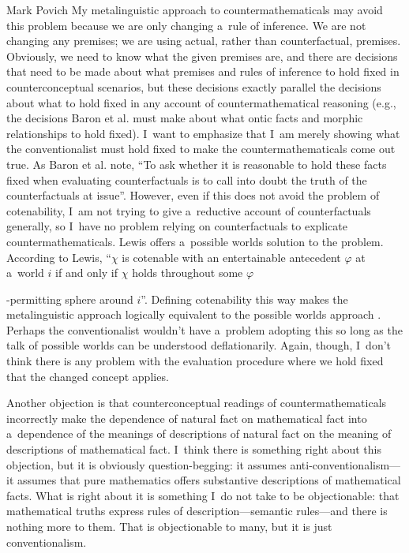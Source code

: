 \begin{artengenv}{Mark Povich}
My metalinguistic approach to countermathematicals may avoid this problem because we are only changing a~rule of inference. We are not changing any premises; we are using actual, rather than counterfactual, premises. Obviously, we need to know what the given premises are, and there are decisions that need to be made about what premises and rules of inference to hold fixed in counterconceptual scenarios, but these decisions exactly parallel the decisions about what to hold fixed in any account of countermathematical reasoning (e.g., the decisions Baron et al. must make about what ontic facts and morphic relationships to hold fixed). I~want to emphasize that I~am merely showing what the conventionalist must hold fixed to make the countermathematicals come out true. As Baron et al.
\parencite*[][p.12]{balaguer_mathematical_2017} %
 note, ``To ask whether it is reasonable to hold these facts fixed when evaluating counterfactuals is to call into doubt the truth of the counterfactuals at issue''. However, even if this does not avoid the problem of cotenability, I~am not trying to give a~reductive account of counterfactuals generally, so I~have no problem relying on counterfactuals to explicate countermathematicals. Lewis 
\parencite*[][p.69]{lewis_counterfactuals_1973} %
 offers a~possible worlds solution to the problem. According to Lewis, ``$\chi $ is cotenable with an entertainable antecedent $\varphi $ at a~world $i$ if and only if $\chi $ holds throughout some $\varphi${-permitting sphere around $i$''. Defining cotenability this way makes the metalinguistic approach logically equivalent to the possible worlds approach 
\parencite[][p.69]{lewis_counterfactuals_1973}. %
 Perhaps the conventionalist wouldn't have a~problem adopting this so long as the talk of possible worlds can be understood deflationarily. Again, though, I~don't think there is any problem with the evaluation procedure where we hold fixed that the changed concept applies.

Another objection is that counterconceptual readings of countermathematicals incorrectly make the dependence of natural fact on mathematical fact into a~dependence of the meanings of descriptions of natural fact on the meaning of descriptions of mathematical fact. I~think there is something right about this objection, but it is obviously question-begging: it assumes anti-conventionalism---it assumes that pure mathematics offers substantive descriptions of mathematical facts. What is right about it is something I~do not take to be objectionable: that mathematical truths express rules of description---semantic rules---and there is nothing more to them. That is objectionable to many, but it is just conventionalism.

}
\end{artengenv}
